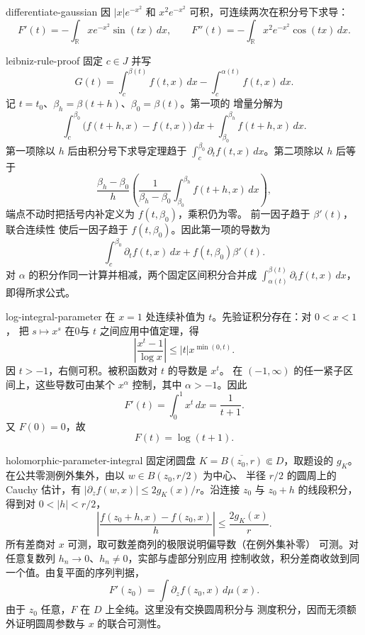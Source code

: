 \begin{solution}{differentiate-gaussian}
因 \(|x|e^{-x^2}\) 和 \(x^2e^{-x^2}\) 可积，可连续两次在积分号下求导：
\[
 F'(t)=-\int_{\mathbb R}xe^{-x^2}\sin(tx)\,dx,
\qquad
 F''(t)=-\int_{\mathbb R}x^2e^{-x^2}\cos(tx)\,dx.
\]
\end{solution}

\begin{solution}{leibniz-rule-proof}
固定 \(c\in J\) 并写
\[
 G(t)=\int_c^{\beta(t)}f(t,x)\,dx
      -\int_c^{\alpha(t)}f(t,x)\,dx.
\]
记 \(t=t_0\)、\(\beta_h=\beta(t+h)\)、\(\beta_0=\beta(t)\)。第一项的
增量分解为
\[
 \int_c^{\beta_0}\bigl(f(t+h,x)-f(t,x)\bigr)\,dx
 +\int_{\beta_0}^{\beta_h}f(t+h,x)\,dx.
\]
第一项除以 \(h\) 后由积分号下求导定理趋于
\(\int_c^{\beta_0}\partial_tf(t,x)\,dx\)。第二项除以 \(h\) 后等于
\[
 \frac{\beta_h-\beta_0}{h}
 \left(
  \frac1{\beta_h-\beta_0}
  \int_{\beta_0}^{\beta_h}f(t+h,x)\,dx
 \right),
\]
端点不动时把括号内补定义为 \(f(t,\beta_0)\)，乘积仍为零。
前一因子趋于 \(\beta'(t)\)，联合连续性
使后一因子趋于 \(f(t,\beta_0)\)。因此第一项的导数为
\[
 \int_c^{\beta_0}\partial_tf(t,x)\,dx
 +f(t,\beta_0)\beta'(t).
\]
对 \(\alpha\) 的积分作同一计算并相减，两个固定区间积分合并成
\(\int_{\alpha(t)}^{\beta(t)}\partial_tf(t,x)\,dx\)，即得所求公式。
\end{solution}

\begin{solution}{log-integral-parameter}
在 \(x=1\) 处连续补值为 \(t\)。先验证积分存在：对 \(0<x<1\)，
把 \(s\mapsto x^s\) 在0与 \(t\) 之间应用中值定理，得
\[
 \left|\frac{x^t-1}{\log x}\right|
 \le |t|x^{\min(0,t)}.
\]
因 \(t>-1\)，右侧可积。被积函数对 \(t\) 的导数是 \(x^t\)。
在 \((-1,\infty)\) 的任一紧子区间上，这些导数可由某个
\(x^\alpha\) 控制，其中 \(\alpha>-1\)。因此
\[
 F'(t)=\int_0^1x^t\,dx=\frac1{t+1}.
\]
又 \(F(0)=0\)，故
\[
 F(t)=\log(t+1).
\]
\end{solution}

\begin{solution}{holomorphic-parameter-integral}
固定闭圆盘 \(K=\overline{B(z_0,r)}\Subset D\)，取题设的
\(g_K\)。在公共零测例外集外，由以 \(w\in B(z_0,r/2)\) 为中心、
半径 \(r/2\) 的圆周上的 Cauchy 估计，有
\(|\partial_z f(w,x)|\le 2g_K(x)/r\)。沿连接 \(z_0\) 与
\(z_0+h\) 的线段积分，得到对 \(0<|h|<r/2\)，
\[
 \left|\frac{f(z_0+h,x)-f(z_0,x)}h\right|
 \le \frac{2g_K(x)}r.
\]
所有差商对 \(x\) 可测，取可数差商列的极限说明偏导数（在例外集补零）
可测。对任意复数列 \(h_n\to0\)、\(h_n\ne0\)，实部与虚部分别应用
控制收敛，积分差商收敛到同一个值。由复平面的序列判据，
\[
 F'(z_0)=\int \partial_z f(z_0,x)\,d\mu(x).
\]
由于 \(z_0\) 任意，\(F\) 在 \(D\) 上全纯。这里没有交换圆周积分与
测度积分，因而无须额外证明圆周参数与 \(x\) 的联合可测性。
\end{solution}

